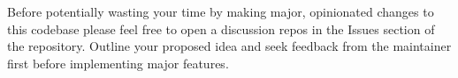 Before potentially wasting your time by making major, opinionated changes to this codebase please feel free to open a discussion repos in the Issues section of the repository. Outline your proposed idea and seek feedback from the maintainer first before implementing major features. 